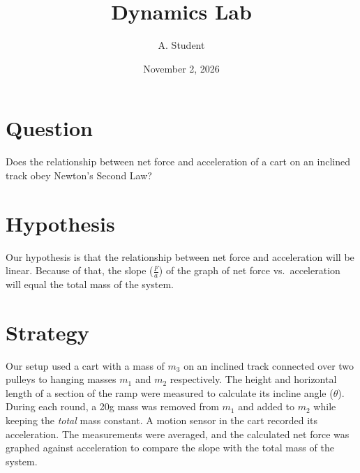 \documentclass[11pt,twocolumn]{article}
\title{Dynamics Lab}
\author{A. Student}
\date{November 2, 2026}
\begin{document}
\raggedbottom
\maketitle

\section{Question}

Does the relationship between net force and acceleration of a cart on an inclined track obey Newton's Second Law?

\section{Hypothesis}

Our hypothesis is that the relationship between net force and acceleration will be linear. Because of that, the slope ($\frac{F}{a}$) of the graph of net force vs.\ acceleration will equal the total mass of the system.

\section{Strategy}

Our setup used a cart with a mass of $m_3$ on an inclined track connected over two pulleys to hanging masses $m_1$ and $m_2$ respectively. The height and horizontal length of a section of the ramp were measured to calculate its incline angle ($\theta$). During each round, a 20g mass was removed from $m_1$ and added to $m_2$ while keeping the \textit{total} mass constant. A motion sensor in the cart recorded its acceleration. The measurements were averaged, and the calculated net force was graphed against acceleration to compare the slope with the total mass of the system.
\end{document}
